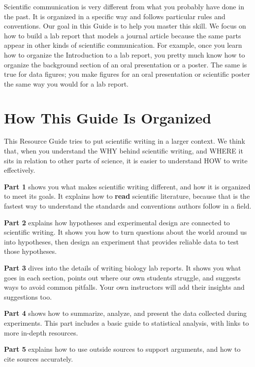 \documentclass[
]{book}
\begin{document}
Scientific communication is very different from what you probably have done in the past. It is organized in a specific way and follows particular rules and conventions. Our goal in this Guide is to help you master this skill. We focus on how to build a lab report that models a journal article because the same parts appear in other kinds of scientific communication. For example, once you learn how to organize the Introduction to a lab report, you pretty much know how to organize the background section of an oral presentation or a poster. The same is true for data figures; you make figures for an oral presentation or scientific poster the same way you would for a lab report.

\hypertarget{how-this-guide-is-organized}{%
\section*{How This Guide Is Organized}\label{how-this-guide-is-organized}}

This Resource Guide tries to put scientific writing in a larger context. We think that, when you understand the WHY behind scientific writing, and WHERE it sits in relation to other parts of science, it is easier to understand HOW to write effectively.

\textbf{Part 1} shows you what makes scientific writing different, and how it is organized to meet its goals. It explains how to \textbf{read} scientific literature, because that is the fastest way to understand the standards and conventions authors follow in a field.

\textbf{Part 2} explains how hypotheses and experimental design are connected to scientific writing. It shows you how to turn questions about the world around us into hypotheses, then design an experiment that provides reliable data to test those hypotheses.

\textbf{Part 3} dives into the details of writing biology lab reports. It shows you what goes in each section, points out where our own students struggle, and suggests ways to avoid common pitfalls. Your own instructors will add their insights and suggestions too.

\textbf{Part 4} shows how to summarize, analyze, and present the data collected during experiments. This part includes a basic guide to statistical analysis, with links to more in-depth resources.

\textbf{Part 5} explains how to use outside sources to support arguments, and how to cite sources accurately.
\end{document}
